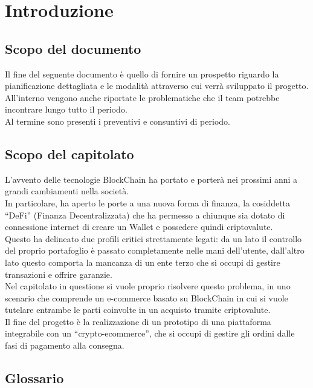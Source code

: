 \section{Introduzione} \label{section:introduzione}

\subsection{Scopo del documento} \label{subsection:intro_scopo_documento}
Il fine del seguente documento è quello di fornire un prospetto riguardo la pianificazione dettagliata e le modalità attraverso cui verrà sviluppato il progetto.\\
All'interno vengono anche riportate le problematiche che il team potrebbe incontrare lungo tutto il periodo.\\
Al termine sono presenti i preventivi e consuntivi di periodo.

\subsection{Scopo del capitolato} \label{subsection:intro_scopo_capitolato}
L'avvento delle tecnologie BlockChain\glo{} ha portato e porterà nei prossimi anni a grandi cambiamenti nella società.\\
In particolare, ha aperto le porte a una nuova forma di finanza, la cosiddetta “DeFi” (Finanza Decentralizzata) che ha permesso a chiunque sia dotato di connessione
 internet di creare un Wallet\glo{} e possedere quindi criptovalute\glo{}.\\
Questo ha delineato due profili critici strettamente legati: da un lato il controllo del proprio portafoglio è passato completamente nelle mani dell'utente, 
dall'altro lato questo comporta la mancanza di un ente terzo che si occupi di gestire transazioni e offrire garanzie.\\
Nel capitolato in questione si vuole proprio risolvere questo problema, in uno scenario che comprende un e-commerce\glo{} basato su BlockChain\glo{} in cui si 
vuole tutelare entrambe le parti coinvolte in un acquisto tramite criptovalute.\\
Il fine del progetto è la realizzazione di un prototipo di una piattaforma integrabile con un “crypto-ecommerce”\glo{}, che si occupi di gestire gli ordini dalle 
fasi di pagamento alla consegna.

\subsection{Glossario} \label{subsection:intro_glossario}
\gloDesc

